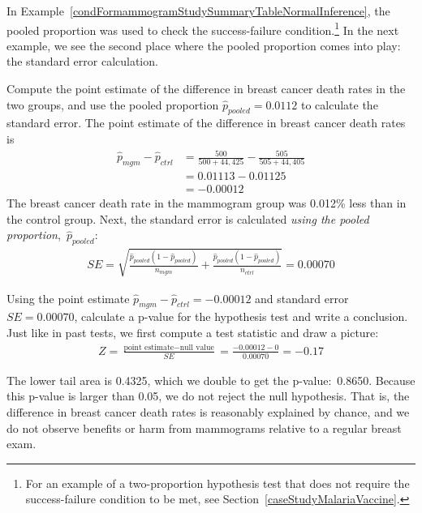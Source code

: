 In Example~\ref{condFormammogramStudySummaryTableNormalInference},
the pooled proportion was used to check the success-failure
condition.\footnote{For an example of a two-proportion
  hypothesis test that does not require the
  success-failure condition to be met, see
  Section~\ref{caseStudyMalariaVaccine}.}
In the next example, we see the second place where the pooled
proportion comes into play: the standard error calculation.

\D{\newpage}

\begin{examplewrap}
\begin{nexample}{Compute the point estimate of the difference
    in breast cancer death rates in the two groups,
    and use the pooled proportion
    $\hat{p}_{\textit{pooled}} = 0.0112$ to calculate
    the standard error.}
  The point estimate of the difference in breast cancer death
  rates is
  \begin{align*}
  \hat{p}_{mgm} - \hat{p}_{ctrl}
    &= \frac{500}{500 + 44,425} - \frac{505}{505 + 44,405} \\
    &= 0.01113 - 0.01125 \\
    &= -0.00012
  \end{align*}
  The breast cancer death rate in the mammogram group
  was 0.012\% less than in the control group.
  Next, the standard error is calculated
  \emph{using the pooled proportion},~$\hat{p}_{\textit{pooled}}$:
\begin{align*}
SE = \sqrt{
      \frac{\hat{p}_{\textit{pooled}}(1-\hat{p}_{\textit{pooled}})}
          {n_{mgm}}
      + \frac{\hat{p}_{\textit{pooled}}(1-\hat{p}_{\textit{pooled}})}
          {n_{ctrl}}
    }
	= 0.00070
\end{align*}
\end{nexample}
\end{examplewrap}

\begin{examplewrap}
\begin{nexample}{Using the point estimate $\hat{p}_{mgm} - \hat{p}_{ctrl} = -0.00012$ and standard error $SE = 0.00070$, calculate a p-value for the hypothesis test and write a conclusion.}
Just like in past tests, we first compute a test statistic and draw a picture:
\begin{align*}
Z = \frac{\text{point estimate} - \text{null value}}{SE}
	= \frac{-0.00012 - 0}{0.00070}
	= -0.17
\end{align*}
\begin{center}
\end{center}
The lower tail area is 0.4325, which we double to get the p-value:~0.8650. Because this p-value is larger than 0.05, we do not reject the null hypothesis. That is, the difference in breast cancer death rates is reasonably explained by chance, and we do not observe benefits or harm from mammograms relative to a regular breast exam.
\end{nexample}
\end{examplewrap}

